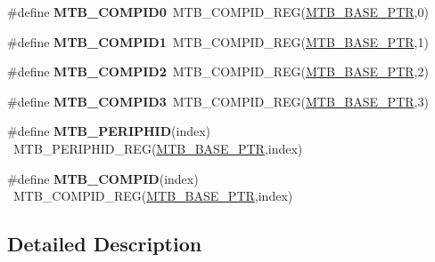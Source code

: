 \begin{DoxyCompactItemize}
\item 
\hypertarget{group___m_t_b___register___accessor___macros_ga901855e16dc139d51b1bf714d6d95f16}{}\#define {\bfseries M\+T\+B\+\_\+\+C\+O\+M\+P\+I\+D0}~M\+T\+B\+\_\+\+C\+O\+M\+P\+I\+D\+\_\+\+R\+E\+G(\hyperlink{group___m_t_b___peripheral_gadf7f362dfa67354951e6a23ddf08cd73}{M\+T\+B\+\_\+\+B\+A\+S\+E\+\_\+\+P\+T\+R},0)\label{group___m_t_b___register___accessor___macros_ga901855e16dc139d51b1bf714d6d95f16}

\item 
\hypertarget{group___m_t_b___register___accessor___macros_ga15d3e8373163542151e15ba67f8796a4}{}\#define {\bfseries M\+T\+B\+\_\+\+C\+O\+M\+P\+I\+D1}~M\+T\+B\+\_\+\+C\+O\+M\+P\+I\+D\+\_\+\+R\+E\+G(\hyperlink{group___m_t_b___peripheral_gadf7f362dfa67354951e6a23ddf08cd73}{M\+T\+B\+\_\+\+B\+A\+S\+E\+\_\+\+P\+T\+R},1)\label{group___m_t_b___register___accessor___macros_ga15d3e8373163542151e15ba67f8796a4}

\item 
\hypertarget{group___m_t_b___register___accessor___macros_gae583594b06b5ef3ec80b99fa81d38738}{}\#define {\bfseries M\+T\+B\+\_\+\+C\+O\+M\+P\+I\+D2}~M\+T\+B\+\_\+\+C\+O\+M\+P\+I\+D\+\_\+\+R\+E\+G(\hyperlink{group___m_t_b___peripheral_gadf7f362dfa67354951e6a23ddf08cd73}{M\+T\+B\+\_\+\+B\+A\+S\+E\+\_\+\+P\+T\+R},2)\label{group___m_t_b___register___accessor___macros_gae583594b06b5ef3ec80b99fa81d38738}

\item 
\hypertarget{group___m_t_b___register___accessor___macros_ga9bcae33e61ced6f8a480cb42bb9405af}{}\#define {\bfseries M\+T\+B\+\_\+\+C\+O\+M\+P\+I\+D3}~M\+T\+B\+\_\+\+C\+O\+M\+P\+I\+D\+\_\+\+R\+E\+G(\hyperlink{group___m_t_b___peripheral_gadf7f362dfa67354951e6a23ddf08cd73}{M\+T\+B\+\_\+\+B\+A\+S\+E\+\_\+\+P\+T\+R},3)\label{group___m_t_b___register___accessor___macros_ga9bcae33e61ced6f8a480cb42bb9405af}

\item 
\hypertarget{group___m_t_b___register___accessor___macros_gab801f8d7fef0f9d6e079283a4f975a4c}{}\#define {\bfseries M\+T\+B\+\_\+\+P\+E\+R\+I\+P\+H\+I\+D}(index)                                        ~M\+T\+B\+\_\+\+P\+E\+R\+I\+P\+H\+I\+D\+\_\+\+R\+E\+G(\hyperlink{group___m_t_b___peripheral_gadf7f362dfa67354951e6a23ddf08cd73}{M\+T\+B\+\_\+\+B\+A\+S\+E\+\_\+\+P\+T\+R},index)\label{group___m_t_b___register___accessor___macros_gab801f8d7fef0f9d6e079283a4f975a4c}

\item 
\hypertarget{group___m_t_b___register___accessor___macros_ga59398557811cd1b8dde435e703ce12b9}{}\#define {\bfseries M\+T\+B\+\_\+\+C\+O\+M\+P\+I\+D}(index)                                            ~M\+T\+B\+\_\+\+C\+O\+M\+P\+I\+D\+\_\+\+R\+E\+G(\hyperlink{group___m_t_b___peripheral_gadf7f362dfa67354951e6a23ddf08cd73}{M\+T\+B\+\_\+\+B\+A\+S\+E\+\_\+\+P\+T\+R},index)\label{group___m_t_b___register___accessor___macros_ga59398557811cd1b8dde435e703ce12b9}

\end{DoxyCompactItemize}


\subsection{Detailed Description}

